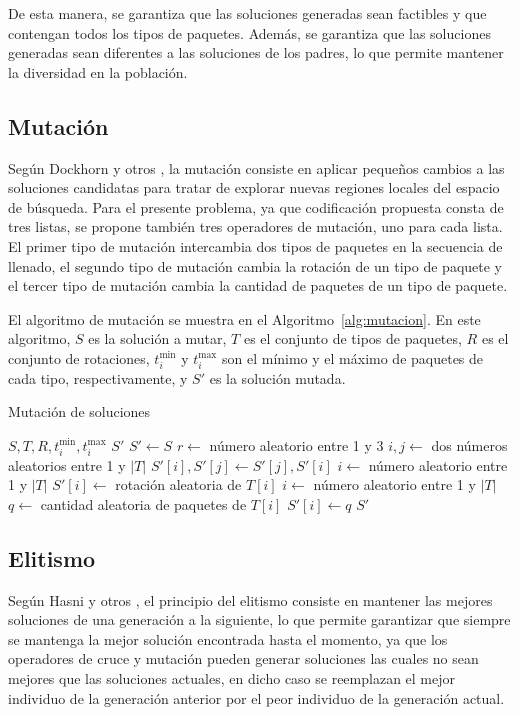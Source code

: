 De esta manera, se garantiza que las soluciones generadas sean factibles y que contengan todos los tipos de paquetes. Además, se garantiza que las soluciones generadas sean diferentes a las soluciones de los padres, lo que permite mantener la diversidad en la población.

\subsection{Mutación}

Según Dockhorn y otros \textcite{Dockhorn2022}, la mutación consiste en aplicar pequeños cambios a las soluciones candidatas para tratar de explorar nuevas regiones locales del espacio de búsqueda. Para el presente problema, ya que codificación propuesta consta de tres listas, se propone también tres operadores de mutación, uno para cada lista. El primer tipo de mutación intercambia dos tipos de paquetes en la secuencia de llenado, el segundo tipo de mutación cambia la rotación de un tipo de paquete y el tercer tipo de mutación cambia la cantidad de paquetes de un tipo de paquete.

El algoritmo de mutación se muestra en el Algoritmo~\ref{alg:mutacion}. En este algoritmo, $S$ es la solución a mutar, $T$ es el conjunto de tipos de paquetes, $R$ es el conjunto de rotaciones, $t_i^{\min}$ y $t_i^{\max}$ son el mínimo y el máximo de paquetes de cada tipo, respectivamente, y $S'$ es la solución mutada.

\begin{algorithm}[H]
\caption{Mutación de soluciones}\label{alg:mutacion}
\begin{algorithmic}[1]
\Require $S, T, R, t_i^{\min}, t_i^{\max}$
\Ensure $S'$
\State $S' \leftarrow S$
\State $r \leftarrow$ número aleatorio entre 1 y 3
    \State $i, j \leftarrow$ dos números aleatorios entre 1 y $|T|$
    \State $S'[i], S'[j] \leftarrow S'[j], S'[i]$
    \State $i \leftarrow$ número aleatorio entre 1 y $|T|$
    \State $S'[i] \leftarrow$ rotación aleatoria de $T[i]$
    \State $i \leftarrow$ número aleatorio entre 1 y $|T|$
    \State $q \leftarrow$ cantidad aleatoria de paquetes de $T[i]$
    \State $S'[i] \leftarrow q$
\EndIf
\State \Return $S'$
\end{algorithmic}
\end{algorithm}

\subsection{Elitismo}

Según Hasni y otros \textcite{Hasni2013}, el principio del elitismo consiste en mantener las mejores soluciones de una generación a la siguiente, lo que permite garantizar que siempre se mantenga la mejor solución encontrada hasta el momento, ya que los operadores de cruce y mutación pueden generar soluciones las cuales no sean mejores que las soluciones actuales, en dicho caso se reemplazan el mejor individuo de la generación anterior por el peor individuo de la generación actual.